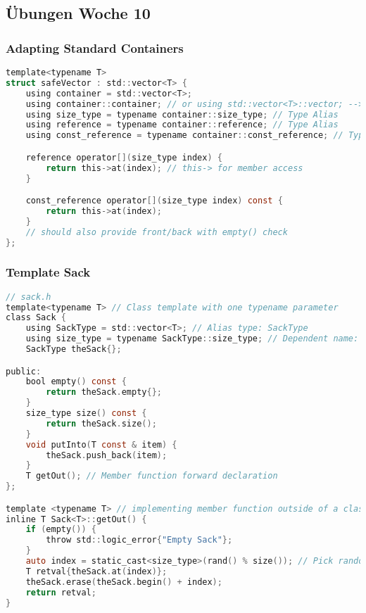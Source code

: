 
\subsection{Übungen Woche 10}

\subsubsection{Adapting Standard Containers}
\begin{lstlisting}[style=frame, style= linenumbers, language=C]
template<typename T>
struct safeVector : std::vector<T> {
    using container = std::vector<T>;
    using container::container; // or using std::vector<T>::vector; --> Inherits constructors with using
    using size_type = typename container::size_type; // Type Alias
    using reference = typename container::reference; // Type Alias
    using const_reference = typename container::const_reference; // Type Alias

    reference operator[](size_type index) {
        return this->at(index); // this-> for member access
    }

    const_reference operator[](size_type index) const {
        return this->at(index);
    }
    // should also provide front/back with empty() check
};
\end{lstlisting}

\subsubsection{Template Sack}
\begin{lstlisting}[style=frame, style= linenumbers, language=C]
// sack.h
template<typename T> // Class template with one typename parameter
class Sack {
    using SackType = std::vector<T>; // Alias type: SackType
    using size_type = typename SackType::size_type; // Dependent name: size_type
    SackType theSack{};

public:
    bool empty() const {
        return theSack.empty{};
    }
    size_type size() const {
        return theSack.size();
    }
    void putInto(T const & item) {
        theSack.push_back(item);
    }
    T getOut(); // Member function forward declaration
};

template <typename T> // implementing member function outside of a class
inline T Sack<T>::getOut() {
    if (empty()) {
        throw std::logic_error{"Empty Sack"};
    }
    auto index = static_cast<size_type>(rand() % size()); // Pick random element
    T retval{theSack.at(index)};
    theSack.erase(theSack.begin() + index);
    return retval;
}
\end{lstlisting}

